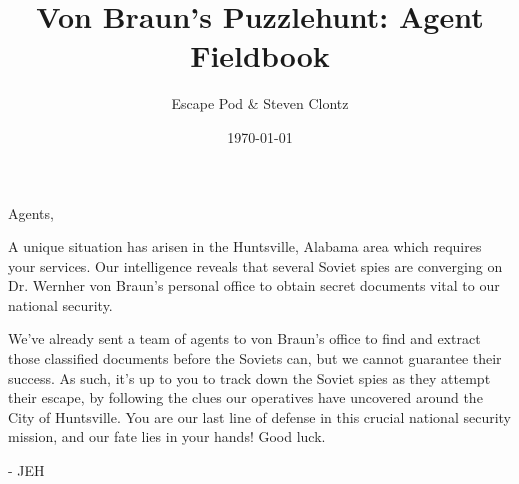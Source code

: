 \documentclass{puzzlehunt}
\title{Von Braun's Puzzlehunt: Agent Fieldbook}
\author{Escape Pod \& Steven Clontz}
\date{\today}
\begin{document}
\frontmatter %

\phTitlePage %


\mainmatter %


%

\noindent Agents,

A unique situation has arisen in the Huntsville, Alabama area which requires
your services. Our intelligence reveals that several Soviet spies are converging
on Dr. Wernher von Braun's personal office to obtain secret documents vital to
our national security.

We've already sent a team of agents to von Braun's office to find and extract
those classified documents before the Soviets can, but we cannot guarantee
their success. As such, it's up to you to track down the Soviet spies as they
attempt their escape, by following the clues our operatives have uncovered
around the City of Huntsville. You are our last line of defense in this crucial
national security mission, and our fate lies in your hands! Good luck.

- JEH
\end{document}
